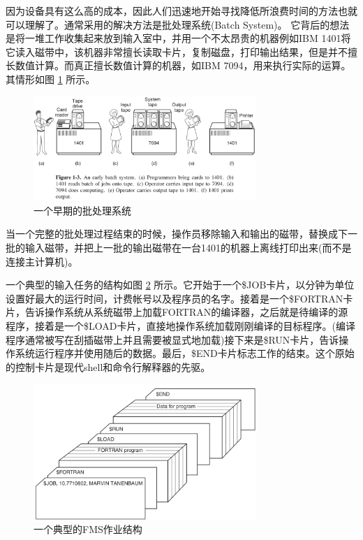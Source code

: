 	因为设备具有这么高的成本，因此人们迅速地开始寻找降低所浪费时间的方法也就可以理解了。通常采用的解决方法是批处理系统(Batch System)。
	它背后的想法是将一堆工作收集起来放到输入室中，并用一个不太昂贵的机器例如IBM 1401将它读入磁带中，该机器非常擅长读取卡片，复制磁盘，打印输出结果，但是并不擅长数值计算。而真正擅长数值计算的机器，如IBM 7094，用来执行实际的运算。其情形如图 \ref{fig:batchsystem} 所示。
	
	\begin{figure}[ht]\small
		\centering
		\includegraphics[width=0.75\textwidth]{FIG/1-3.png}
		\caption{一个早期的批处理系统}\label{fig:batchsystem}
	\end{figure}

	当一个完整的批处理过程结束的时候，操作员移除输入和输出的磁带，替换成下一批的输入磁带，并把上一批的输出磁带在一台1401的机器上离线打印出来(而不是连接主计算机)。
	
	一个典型的输入任务的结构如图 \ref{fig:FMS} 所示。它开始于一个\$JOB卡片，以分钟为单位设置好最大的运行时间，计费帐号以及程序员的名字。接着是一个\$FORTRAN卡片，告诉操作系统从系统磁带上加载FORTRAN的编译器，之后就是待编译的源程序，接着是一个\$LOAD卡片，直接地操作系统加载刚刚编译的目标程序。(编译程序通常被写在刮插磁带上并且需要被显式地加载)接下来是\$RUN卡片，告诉操作系统运行程序并使用随后的数据。最后，\$END卡片标志工作的结束。这个原始的控制卡片是现代shell和命令行解释器的先驱。
	
	\begin{figure}[ht]\small
		\centering
		\includegraphics[width=0.75\textwidth]{FIG/1-4.png}
		\caption{一个典型的FMS作业结构}\label{fig:FMS}
	\end{figure}

